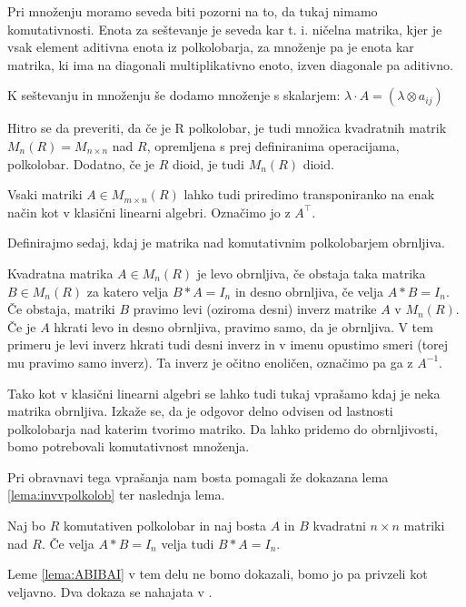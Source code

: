 \documentclass[mat1]{fmfdelo}
\begin{document}
Pri množenju moramo seveda biti pozorni na to, da tukaj nimamo komutativnosti. Enota za seštevanje je seveda kar t. i. ničelna matrika, kjer je vsak element aditivna enota iz polkolobarja, za množenje pa je enota kar matrika, ki ima na diagonali multiplikativno enoto, izven diagonale pa aditivno.

K seštevanju in množenju še dodamo množenje s skalarjem: $\lambda \cdot A = (\lambda \otimes a_{ij})$

Hitro se da preveriti, da če je R polkolobar, je tudi množica kvadratnih matrik $M_n(R) = M_{n\times n}$ nad $R$, opremljena s prej definiranima operacijama, polkolobar. Dodatno, če je $R$ dioid, je tudi $M_n(R)$ dioid.

Vsaki matriki $A\in M_{m\times n}(R)$ lahko tudi priredimo transponiranko na enak način kot v klasični linearni algebri. Označimo jo z $A^{\top}$.

Definirajmo sedaj, kdaj je matrika nad komutativnim polkolobarjem obrnljiva.

\begin{definicija}\label{def:invmatr}
	Kvadratna matrika $A\in M_n(R)$ je levo obrnljiva, če obstaja taka matrika $B\in M_n(R)$ za katero velja $B*A = I_n$ in desno obrnljiva, če velja $A*B = I_n$. Če obstaja, matriki $B$ pravimo levi (oziroma desni) inverz matrike $A$ v $M_n(R)$. Če je $A$ hkrati levo in desno obrnljiva, pravimo samo, da je obrnljiva. V tem primeru je levi inverz hkrati tudi desni inverz in v imenu opustimo smeri (torej mu pravimo samo inverz). Ta inverz je očitno enoličen, označimo pa ga z $A^{-1}$.
\end{definicija}

Tako kot v klasični linearni algebri se lahko tudi tukaj vprašamo kdaj je neka matrika obrnljiva. Izkaže se, da je odgovor delno odvisen od lastnosti polkolobarja nad katerim tvorimo matriko. Da lahko pridemo do obrnljivosti, bomo potrebovali komutativnost množenja.

Pri obravnavi tega vprašanja nam bosta pomagali že dokazana lema \ref{lema:invvpolkolob} ter naslednja lema.

\begin{lema}\label{lema:ABIBAI}
	Naj bo $R$ komutativen polkolobar in naj bosta $A$ in $B$ kvadratni $n\times n$ matriki nad $R$. Če velja $A*B = I_n$ velja tudi $B*A=I_n$.
\end{lema}

Leme \ref{lema:ABIBAI} v tem delu ne bomo dokazali, bomo jo pa privzeli kot veljavno. Dva dokaza se nahajata v \cite{bib:Reutenauer}.
\end{document}
